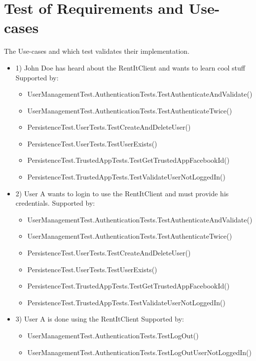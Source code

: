 \section{Test of Requirements and Use-cases}
\label{TestAppendix} 
The Use-cases and which test validates their implementation.

\begin{itemize}

\item 1)
John Doe has heard about the RentItClient and wants to learn cool stuff
\newline Supported by:
\begin{itemize}
\item UserManagementTest.AuthenticationTests.TestAuthenticateAndValidate()
\item UserManagementTest.AuthenticationTests.TestAuthenticateTwice()
\item PersistenceTest.UserTests.TestCreateAndDeleteUser()
\item PersistenceTest.UserTests.TestUserExists()
\item PersistenceTest.TrustedAppTests.TestGetTrustedAppFacebookId()
\item PersistenceTest.TrustedAppTests.TestValidateUserNotLoggedIn()
\end{itemize}

\item 2)
User A wants to login to use the RentItClient and must provide his credentials.
\newline Supported by:
\begin{itemize}
\item UserManagementTest.AuthenticationTests.TestAuthenticateAndValidate()
\item UserManagementTest.AuthenticationTests.TestAuthenticateTwice()
\item PersistenceTest.UserTests.TestCreateAndDeleteUser()
\item PersistenceTest.UserTests.TestUserExists()
\item PersistenceTest.TrustedAppTests.TestGetTrustedAppFacebookId()
\item PersistenceTest.TrustedAppTests.TestValidateUserNotLoggedIn()
\end{itemize}

\item 3)
User A is done using the RentItClient
\newline Supported by:
\begin{itemize}
\item UserManagementTest.AuthenticationTests.TestLogOut()
\item UserManagementTest.AuthenticationTests.TestLogOutUserNotLoggedIn()
\end{itemize}


\end{itemize}
